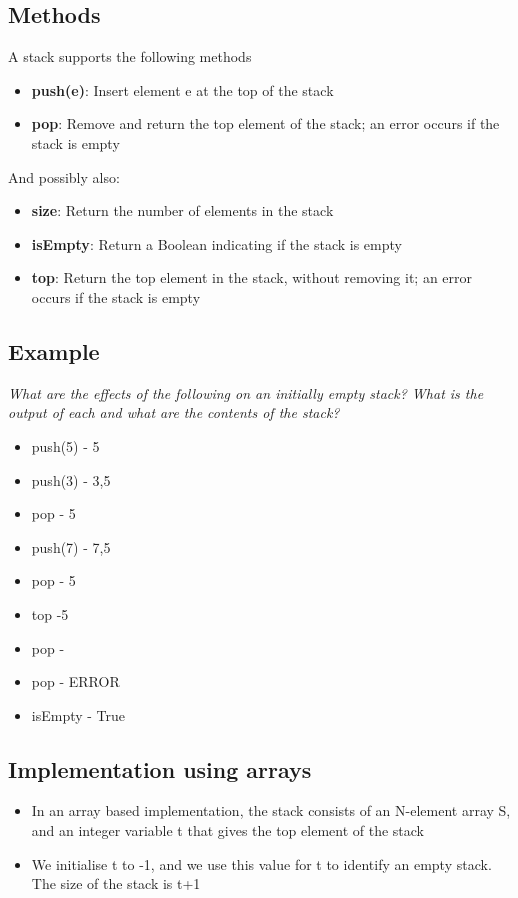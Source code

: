 \documentclass{article}[18pt]
\begin{document}
\subsection{Methods}
A stack supports the following methods
\begin{itemize}
\item \textbf{push(e)}: Insert element e at the top of the stack
\item \textbf{pop}: Remove and return the top element of the stack; an error occurs if the stack is empty
\end{itemize}
And possibly also:
\begin{itemize}
\item \textbf{size}: Return the number of elements in the stack
\item \textbf{isEmpty}: Return a Boolean indicating if the stack is empty
\item \textbf{top}: Return the top element in the stack, without removing it; an error occurs if the stack is empty
\end{itemize}
\subsection{Example}
\textit{What are the effects of the following on an initially empty stack? What is the output of each and what are the contents of the stack?}
\begin{itemize}
\item push(5) - 5
\item push(3) - 3,5
\item pop - 5
\item push(7) - 7,5
\item pop - 5
\item top -5
\item pop - 
\item pop - ERROR
\item isEmpty - True
\end{itemize}
\subsection{Implementation using arrays}
\begin{itemize}
\item In an array based implementation, the stack consists of an N-element array S, and an integer variable t that gives the top element of the stack
\item We initialise t to -1, and we use this value for t to identify an empty stack. The size of the stack is t+1
\end{itemize}
\end{document}
